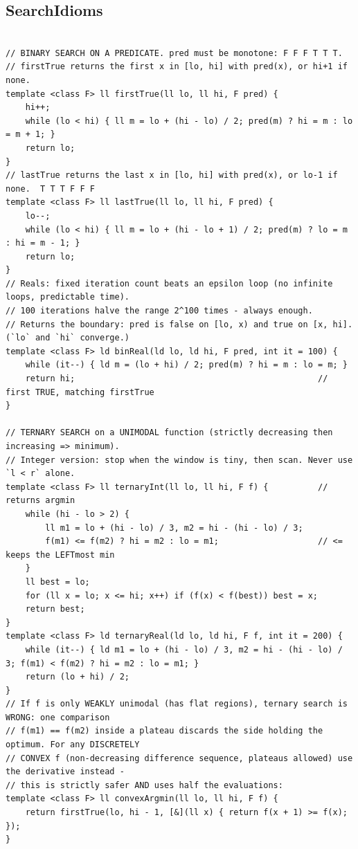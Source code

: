 \documentclass[9pt,a4paper,twocolumn]{extarticle}
\begin{document}
\subsection{SearchIdioms}
\nopagebreak
\begin{lstlisting}

// BINARY SEARCH ON A PREDICATE. pred must be monotone: F F F T T T.
// firstTrue returns the first x in [lo, hi] with pred(x), or hi+1 if none.
template <class F> ll firstTrue(ll lo, ll hi, F pred) {
    hi++;
    while (lo < hi) { ll m = lo + (hi - lo) / 2; pred(m) ? hi = m : lo = m + 1; }
    return lo;
}
// lastTrue returns the last x in [lo, hi] with pred(x), or lo-1 if none.  T T T F F F
template <class F> ll lastTrue(ll lo, ll hi, F pred) {
    lo--;
    while (lo < hi) { ll m = lo + (hi - lo + 1) / 2; pred(m) ? lo = m : hi = m - 1; }
    return lo;
}
// Reals: fixed iteration count beats an epsilon loop (no infinite loops, predictable time).
// 100 iterations halve the range 2^100 times - always enough.
// Returns the boundary: pred is false on [lo, x) and true on [x, hi]. (`lo` and `hi` converge.)
template <class F> ld binReal(ld lo, ld hi, F pred, int it = 100) {
    while (it--) { ld m = (lo + hi) / 2; pred(m) ? hi = m : lo = m; }
    return hi;                                                 // first TRUE, matching firstTrue
}

// TERNARY SEARCH on a UNIMODAL function (strictly decreasing then increasing => minimum).
// Integer version: stop when the window is tiny, then scan. Never use `l < r` alone.
template <class F> ll ternaryInt(ll lo, ll hi, F f) {          // returns argmin
    while (hi - lo > 2) {
        ll m1 = lo + (hi - lo) / 3, m2 = hi - (hi - lo) / 3;
        f(m1) <= f(m2) ? hi = m2 : lo = m1;                    // <= keeps the LEFTmost min
    }
    ll best = lo;
    for (ll x = lo; x <= hi; x++) if (f(x) < f(best)) best = x;
    return best;
}
template <class F> ld ternaryReal(ld lo, ld hi, F f, int it = 200) {
    while (it--) { ld m1 = lo + (hi - lo) / 3, m2 = hi - (hi - lo) / 3; f(m1) < f(m2) ? hi = m2 : lo = m1; }
    return (lo + hi) / 2;
}
// If f is only WEAKLY unimodal (has flat regions), ternary search is WRONG: one comparison
// f(m1) == f(m2) inside a plateau discards the side holding the optimum. For any DISCRETELY
// CONVEX f (non-decreasing difference sequence, plateaus allowed) use the derivative instead -
// this is strictly safer AND uses half the evaluations:
template <class F> ll convexArgmin(ll lo, ll hi, F f) {
    return firstTrue(lo, hi - 1, [&](ll x) { return f(x + 1) >= f(x); });
}


\end{lstlisting}
\end{document}
